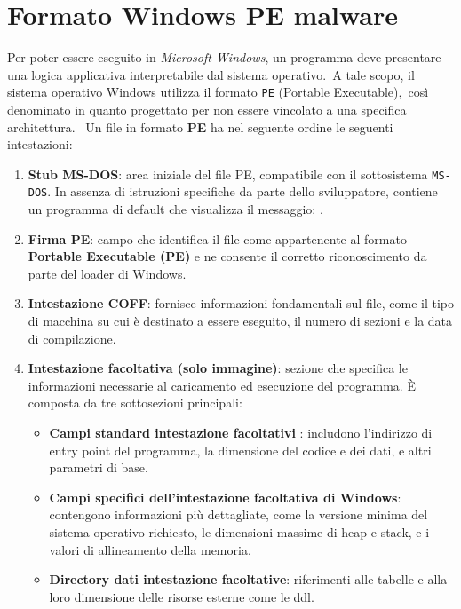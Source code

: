 \section{Formato Windows PE malware}

Per poter essere eseguito in \textit{Microsoft Windows}, un programma deve presentare una logica applicativa interpretabile dal sistema operativo.\
A tale scopo, il sistema operativo Windows utilizza il formato \texttt{PE} (Portable Executable),\
così denominato in quanto progettato per non essere vincolato a una specifica architettura.
\
Un file in formato \textbf{PE} ha nel seguente ordine le seguenti intestazioni:
\begin{enumerate}
      \item \textbf{Stub MS-DOS}: area iniziale del file PE, compatibile con il sottosistema \texttt{MS-DOS}.
            In assenza di istruzioni specifiche da parte dello sviluppatore, contiene un programma di default che
            visualizza il messaggio: .
      \item \textbf{Firma PE}: campo che identifica il file come appartenente al formato \textbf{Portable Executable (PE)}
            e ne consente il corretto riconoscimento da parte del loader di Windows.
      \item \textbf{Intestazione COFF}: fornisce informazioni fondamentali sul file, come il tipo di macchina su cui è
            destinato a essere eseguito, il numero di sezioni e la data di compilazione.

      \item \textbf{Intestazione facoltativa (solo immagine)}: sezione che specifica le informazioni necessarie al
            caricamento ed esecuzione del programma. È composta da tre sottosezioni principali:
            \begin{itemize}
                  \item \textbf{Campi standard intestazione facoltativi }: includono l'indirizzo di entry point del programma, la dimensione del codice
                        e dei dati, e altri parametri di base.

                  \item \textbf{Campi specifici dell'intestazione facoltativa di Windows}: contengono informazioni più dettagliate, come la versione
                        minima del sistema operativo richiesto, le dimensioni massime di heap e stack, e i valori di allineamento della memoria.

                  \item \textbf{Directory dati intestazione facoltative}: riferimenti alle tabelle e alla loro dimensione delle risorse esterne come le ddl.
            \end{itemize}
\end{enumerate}

